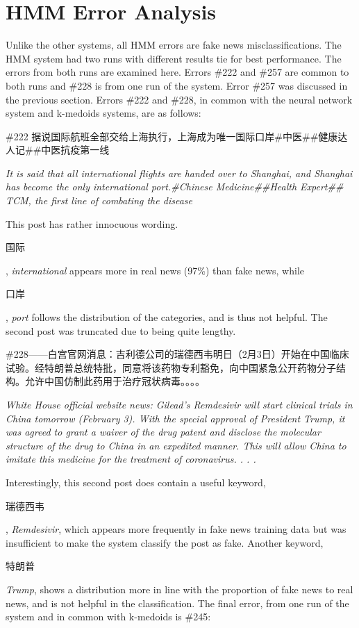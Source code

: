 \documentclass [11pt, proquest] {uwthesis}[2020/02/24]
\begin{document}
\section{HMM Error Analysis}
Unlike the other systems, all HMM errors are fake news misclassifications. The HMM system had two runs with different results tie for best performance. The errors from both runs are examined here. Errors \#222 and \#257 are common to both runs and \#228 is from one run of the system. Error \#257 was discussed in the previous section. Errors \#222 and \#228, in common with the neural network system and k-medoids systems, are as follows:

\begin{CJK*}{UTF8}{gbsn}\#222 据说国际航班全部交给上海执行，上海成为唯一国际口岸\#中医\#\#健康达人记\#\#中医抗疫第一线\end{CJK*}

\textit{It is said that all international flights are handed over to Shanghai, and Shanghai has become the only international port.\#Chinese Medicine\#\#Health Expert\#\#
TCM, the first line of combating the disease}

This post has rather innocuous wording. \begin{CJK*}{UTF8}{gbsn}国际\end{CJK*}, \textit{international} appears more in real news (97\%) than fake news, while  \begin{CJK*}{UTF8}{gbsn}口岸\end{CJK*}, \textit{port} follows the distribution of the categories, and is thus not helpful. The second post was truncated due to being quite lengthy.

\begin{CJK*}{UTF8}{gbsn}\#228——白宫官网消息：吉利德公司的瑞德西韦明日（2月3日）开始在中国临床试验。经特朗普总统特批，同意将该药物专利豁免，向中国紧急公开药物分子结构。允许中国仿制此药用于治疗冠状病毒。。。。\end{CJK*}

\textit{White House official website news: Gilead’s Remdesivir will start clinical trials in China tomorrow (February 3). With the special approval of President Trump, it was agreed to grant a waiver of the drug patent and disclose the molecular structure of the drug to China in an expedited manner. This will allow China to imitate this medicine for the treatment of coronavirus. . . .}

Interestingly, this second post does contain a useful keyword, \begin{CJK*}{UTF8}{gbsn}瑞德西韦\end{CJK*}, \textit{Remdesivir}, which appears more frequently in fake news training data but was insufficient to make the system classify the post as fake. Another keyword,\begin{CJK*}{UTF8}{gbsn}特朗普\end{CJK*} \textit{Trump}, shows a distribution more in line with the proportion of fake news to real news, and is not helpful in the classification. The final error, from one run of the system and in common with k-medoids is \#245:
\end{document}
